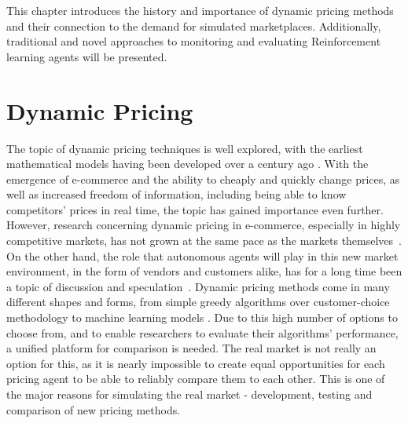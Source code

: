 \begin{jointwork}\label{ch:RelatedWork}
	This chapter introduces the history and importance of dynamic pricing methods and their connection to the demand for simulated marketplaces. Additionally, traditional and novel approaches to monitoring and evaluating Reinforcement learning agents will be presented.
\end{jointwork}

\section{Dynamic Pricing}

The topic of dynamic pricing techniques is well explored, with the earliest mathematical models having been developed over a century ago \cite{DynamicPricingHistory}. With the emergence of e-commerce and the ability to cheaply and quickly change prices, as well as increased freedom of information, including being able to know competitors' prices in real time, the topic has gained importance even further. However, research concerning dynamic pricing in e-commerce, especially in highly competitive markets, has not grown at the same pace as the markets themselves~\cite{PricingEcommerceGrowth}. On the other hand, the role that autonomous agents will play in this new market environment, in the form of vendors and customers alike, has for a long time been a topic of discussion and speculation~\cite{PricingBySoftwareAgents}. Dynamic pricing methods come in many different shapes and forms, from simple greedy algorithms over customer-choice methodology to machine learning models \cite{deGeerPricing}. Due to this high number of options to choose from, and to enable researchers to evaluate their algorithms' performance, a unified platform for comparison is needed. The real market is not really an option for this, as it is nearly impossible to create equal opportunities for each pricing agent to be able to reliably compare them to each other. This is one of the major reasons for simulating the real market - development, testing and comparison of new pricing methods.


